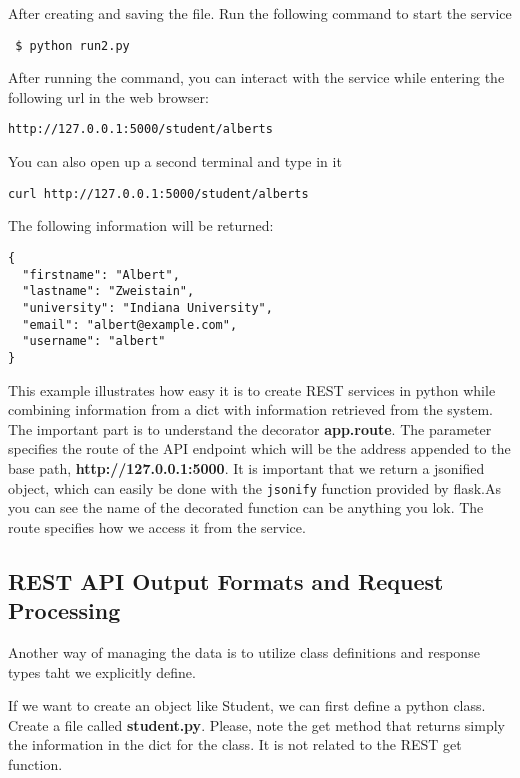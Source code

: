 After creating and saving the file. Run the following command to start
the service


\begin{lstlisting}
 $ python run2.py
\end{lstlisting}

After running the command, you can interact with the service while
entering the  following url in the web browser:

\begin{lstlisting}
http://127.0.0.1:5000/student/alberts
\end{lstlisting}

You can also open up a second terminal and type in it 

\begin{lstlisting}
curl http://127.0.0.1:5000/student/alberts
\end{lstlisting}

The following information will be returned:

\begin{lstlisting}
{
  "firstname": "Albert", 
  "lastname": "Zweistain", 
  "university": "Indiana University", 
  "email": "albert@example.com", 
  "username": "albert"
}
\end{lstlisting}

This example illustrates how easy it is to create REST services in
python while combining information from a dict with information
retrieved from the system. The important part is to understand the
decorator \textbf{app.route}. The parameter specifies the route of the
API endpoint which will be the address appended to the base path,
\textbf{http://127.0.0.1:5000}.  It is important that we return a
jsonified object, which can easily be done with the \verb|jsonify|
function provided by flask.As you can see the name of the decorated
function can be anything you lok. The route specifies how we access it
from the service.

\subsection{REST API Output Formats and Request Processing}

Another way of managing the data is to utilize class definitions and 
response types taht we explicitly define. 

If we want to create an object like Student, we can first define a python class.
Create a file called \textbf{student.py}. Please, note the get method
that returns simply the information in the dict for the class. It is
not related to the REST get function.

